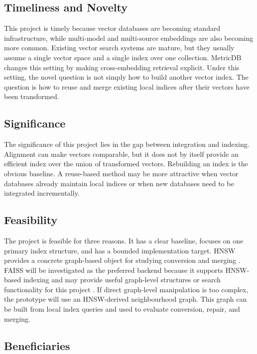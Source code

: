 \documentclass[11pt]{article}
\begin{document}
\subsection{Timeliness and Novelty}

This project is timely because vector databases are becoming standard infrastructure, while multi-model and multi-source embeddings are also becoming more common. Existing vector search systems are mature, but they usually assume a single vector space and a single index over one collection. MetricDB changes this setting by making cross-embedding retrieval explicit. Under this setting, the novel question is not simply how to build another vector index. The question is how to reuse and merge existing local indices after their vectors have been transformed.

\subsection{Significance}

The significance of this project lies in the gap between integration and indexing. Alignment can make vectors comparable, but it does not by itself provide an efficient index over the union of transformed vectors. Rebuilding an index is the obvious baseline. A reuse-based method may be more attractive when vector databases already maintain local indices or when new databases need to be integrated incrementally.

\subsection{Feasibility}

The project is feasible for three reasons. It has a clear baseline, focuses on one primary index structure, and has a bounded implementation target. HNSW provides a concrete graph-based object for studying conversion and merging \cite{malkov2018hnsw}. FAISS will be investigated as the preferred backend because it supports HNSW-based indexing and may provide useful graph-level structures or search functionality for this project \cite{johnson2017faiss}. If direct graph-level manipulation is too complex, the prototype will use an HNSW-derived neighbourhood graph. This graph can be built from local index queries and used to evaluate conversion, repair, and merging.

\subsection{Beneficiaries}
\end{document}
